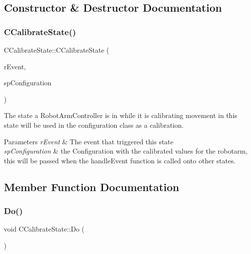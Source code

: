 \subsection{Constructor \& Destructor Documentation}
\mbox{\label{classCCalibrateState_aac8ef64d3e1d849d6e0dee9d219585b6}} 
\subsubsection{\texorpdfstring{C\+Calibrate\+State()}{CCalibrateState()}}
{\footnotesize\ttfamily C\+Calibrate\+State\+::\+C\+Calibrate\+State (\begin{DoxyParamCaption}\item[{\hyperlink{classCEvent}{C\+Event} \&}]{r\+Event,  }\item[{std\+::shared\+\_\+ptr$<$ \hyperlink{classCConfiguration}{C\+Configuration} $>$}]{sp\+Configuration }\end{DoxyParamCaption})}



The state a Robot\+Arm\+Controller is in while it is calibrating movement in this state will be used in the configuration class as a calibration. 


\begin{DoxyParams}{Parameters}
{\em r\+Event} & The event that triggered this state \\
\hline
{\em sp\+Configuration} & the Configuration with the calibrated values for the robotarm, this will be passed when the handle\+Event function is called onto other states. \\
\hline
\end{DoxyParams}


\subsection{Member Function Documentation}
\mbox{\label{classCCalibrateState_a2b2ad369ae655704fadcffb0a4b9fca2}} 
\subsubsection{\texorpdfstring{Do()}{Do()}}
{\footnotesize\ttfamily void C\+Calibrate\+State\+::\+Do (\begin{DoxyParamCaption}{ }\end{DoxyParamCaption})\hspace{0.3cm}{\ttfamily [virtual]}}



